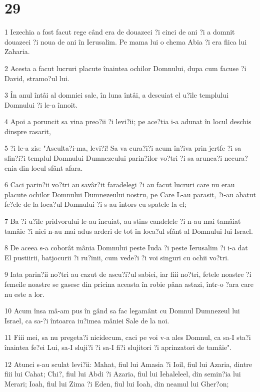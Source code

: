 \chapter{29}

\par 1 Iezechia a fost facut rege când era de douazeci ?i cinci de ani ?i a domnit douazeci ?i noua de ani în Ierusalim. Pe mama lui o chema Abia ?i era fiica lui Zaharia.
\par 2 Acesta a facut lucruri placute înaintea ochilor Domnului, dupa cum facuse ?i David, stramo?ul lui.
\par 3 În anul întâi al domniei sale, în luna întâi, a descuiat el u?ile templului Domnului ?i le-a înnoit.
\par 4 Apoi a poruncit sa vina preo?ii ?i levi?ii; pe ace?tia i-a adunat în locul deschis dinspre rasarit,
\par 5 ?i le-a zis: "Asculta?i-ma, levi?i! Sa va cura?i?i acum în?iva prin jertfe ?i sa sfin?i?i templul Domnului Dumnezeului parin?ilor vo?tri ?i sa arunca?i necura?enia din locul sfânt afara.
\par 6 Caci parin?ii vo?tri au savâr?it faradelegi ?i au facut lucruri care nu erau placute ochilor Domnului Dumnezeului nostru, pe Care L-au parasit, ?i-au abatut fe?ele de la loca?ul Domnului ?i s-au întors cu spatele la el;
\par 7 Ba ?i u?ile pridvorului le-au încuiat, au stins candelele ?i n-au mai tamâiat tamâie ?i nici n-au mai adus arderi de tot în loca?ul sfânt al Domnului lui Israel.
\par 8 De aceea s-a coborât mânia Domnului peste Iuda ?i peste Ierusalim ?i i-a dat El pustiirii, batjocurii ?i ru?inii, cum vede?i ?i voi singuri cu ochii vo?tri.
\par 9 Iata parin?ii no?tri au cazut de ascu?i?ul sabiei, iar fiii no?tri, fetele noastre ?i femeile noastre se gasesc din pricina aceasta în robie pâna astazi, într-o ?ara care nu este a lor.
\par 10 Acum însa mâ-am pus în gând sa fac legamânt cu Domnul Dumnezeul lui Israel, ca sa-?i întoarca iu?imea mâniei Sale de la noi.
\par 11 Fiii mei, sa nu pregeta?i nicidecum, caci pe voi v-a ales Domnul, ca sa-I sta?i înaintea fe?ei Lui, sa-I sluji?i ?i sa-I fi?i slujitori ?i aprinzatori de tamâie".
\par 12 Atunci s-au sculat levi?ii: Mahat, fiul lui Amasia ?i Ioil, fiul lui Azaria, dintre fiii lui Cahat; Chi?, fiul lui Abdi ?i Azaria, fiul lui Iehaleleel, din semin?ia lui Merari; Ioah, fiul lui Zima ?i Eden, fiul lui Ioah, din neamul lui Gher?on;
